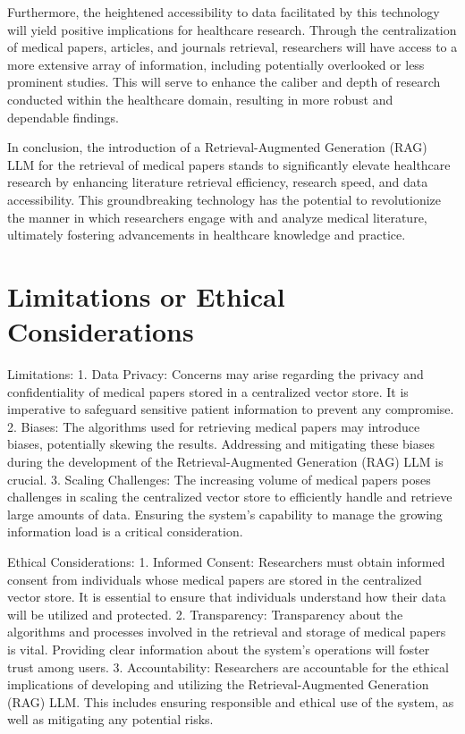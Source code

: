 \documentclass{article}
\begin{document}
Furthermore, the heightened accessibility to data facilitated by this technology will yield positive implications for healthcare research. Through the centralization of medical papers, articles, and journals retrieval, researchers will have access to a more extensive array of information, including potentially overlooked or less prominent studies. This will serve to enhance the caliber and depth of research conducted within the healthcare domain, resulting in more robust and dependable findings.

In conclusion, the introduction of a Retrieval-Augmented Generation (RAG) LLM for the retrieval of medical papers stands to significantly elevate healthcare research by enhancing literature retrieval efficiency, research speed, and data accessibility. This groundbreaking technology has the potential to revolutionize the manner in which researchers engage with and analyze medical literature, ultimately fostering advancements in healthcare knowledge and practice.

\section*{Limitations or Ethical Considerations}
Limitations:
1. Data Privacy: Concerns may arise regarding the privacy and confidentiality of medical papers stored in a centralized vector store. It is imperative to safeguard sensitive patient information to prevent any compromise.
2. Biases: The algorithms used for retrieving medical papers may introduce biases, potentially skewing the results. Addressing and mitigating these biases during the development of the Retrieval-Augmented Generation (RAG) LLM is crucial.
3. Scaling Challenges: The increasing volume of medical papers poses challenges in scaling the centralized vector store to efficiently handle and retrieve large amounts of data. Ensuring the system's capability to manage the growing information load is a critical consideration.

Ethical Considerations:
1. Informed Consent: Researchers must obtain informed consent from individuals whose medical papers are stored in the centralized vector store. It is essential to ensure that individuals understand how their data will be utilized and protected.
2. Transparency: Transparency about the algorithms and processes involved in the retrieval and storage of medical papers is vital. Providing clear information about the system's operations will foster trust among users.
3. Accountability: Researchers are accountable for the ethical implications of developing and utilizing the Retrieval-Augmented Generation (RAG) LLM. This includes ensuring responsible and ethical use of the system, as well as mitigating any potential risks.
\end{document}
